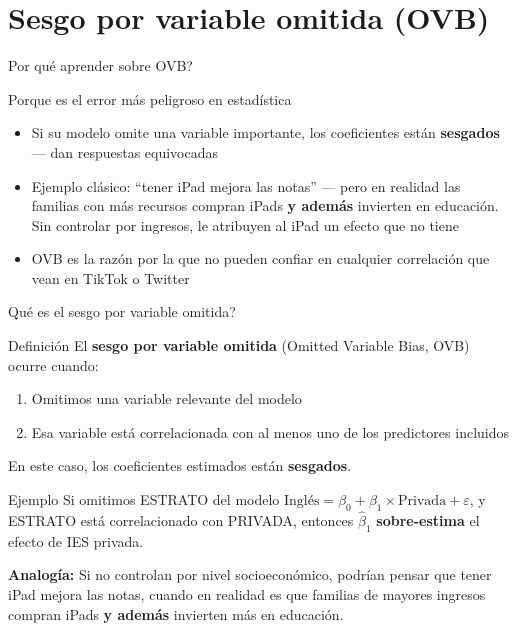 \documentclass[aspectratio=169, 11pt]{beamer}
\begin{document}
\section{Sesgo por variable omitida (OVB)}

\begin{frame}{\textquestiondown{}Por qu\'e aprender sobre OVB?}
\begin{exampleblock}{Porque es el error m\'as peligroso en estad\'istica}
\small
\begin{itemize}\setlength{\itemsep}{2pt}
  \item Si su modelo omite una variable importante, los coeficientes est\'an \textbf{sesgados} --- dan respuestas equivocadas
  \item Ejemplo cl\'asico: ``tener iPad mejora las notas'' --- pero en realidad las familias con m\'as recursos compran iPads \textbf{y adem\'as} invierten en educaci\'on. Sin controlar por ingresos, le atribuyen al iPad un efecto que no tiene
  \item OVB es la raz\'on por la que no pueden confiar en cualquier correlaci\'on que vean en TikTok o Twitter
\end{itemize}
\end{exampleblock}
\end{frame}

\begin{frame}{\textquestiondown Qu\'e es el sesgo por variable omitida?}
\begin{block}{Definici\'on}
El \textbf{sesgo por variable omitida} (Omitted Variable Bias, OVB) ocurre cuando:
\begin{enumerate}
  \item Omitimos una variable relevante del modelo
  \item Esa variable est\'a correlacionada con al menos uno de los predictores incluidos
\end{enumerate}
En este caso, los coeficientes estimados est\'an \textbf{sesgados}.
\end{block}

\vspace{0.1cm}
\begin{exampleblock}{Ejemplo}
\small Si omitimos ESTRATO del modelo $\text{Ingl\'es} = \beta_0 + \beta_1 \times \text{Privada} + \varepsilon$, y ESTRATO est\'a correlacionado con PRIVADA, entonces $\hat{\beta}_1$ \textbf{sobre-estima} el efecto de IES privada.

\smallskip
\textbf{Analog\'ia:} Si no controlan por nivel socioecon\'omico, podr\'ian pensar que tener iPad mejora las notas, cuando en realidad es que familias de mayores ingresos compran iPads \textbf{y adem\'as} invierten m\'as en educaci\'on.
\end{exampleblock}
\end{frame}
\end{document}
